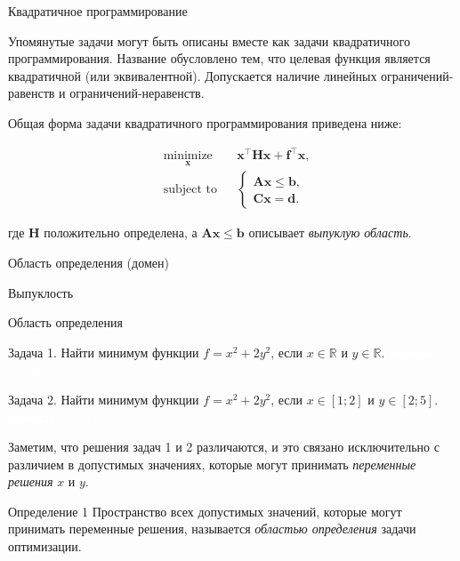 \documentclass{beamer}
\begin{document}
\begin{frame}{Квадратичное программирование}
	\begin{flushleft}
		
		Упомянутые задачи могут быть описаны вместе как задачи квадратичного программирования. Название обусловлено тем, что целевая функция является квадратичной (или эквивалентной). Допускается наличие линейных ограничений-равенств и ограничений-неравенств.
		
		\bigskip
		
		Общая форма задачи квадратичного программирования приведена ниже:
		
		\begin{equation}
			\begin{aligned}
				& \underset{\mathbf{x}}{\text{minimize}}
				& & \mathbf{x}^\top \mathbf{H} \mathbf{x} + \mathbf{f}^\top\mathbf{x}, \\
				& \text{subject to}
				& & \begin{cases}
					\mathbf{A}\mathbf{x} \leq \mathbf{b}, \\
					\mathbf{C}\mathbf{x} = \mathbf{d}.
				\end{cases}
			\end{aligned}
		\end{equation}
		
		где $\mathbf{H}$ положительно определена, а $\mathbf{A}\mathbf{x} \leq \mathbf{b}$ описывает \emph{выпуклую область}.
		
	\end{flushleft}
\end{frame}

\begin{frame}
	\centerline{\huge Область определения (домен)}
	
	\bigskip
	
	\centerline{\huge Выпуклость}
\end{frame}


\begin{frame}{Область определения}
	\begin{flushleft}
		
		Задача 1. Найти минимум функции $f = x^2 + 2y^2$, если $x \in \mathbb{R}$ и $y \in \mathbb{R}$. \textcolor{white}{Решение: $x = 0$, $y = 0$.}
		
		\bigskip
		
		Задача 2. Найти минимум функции $f = x^2 + 2y^2$, если $x \in [1 ; 2]$ и $y \in [2 ; 5]$. \textcolor{white}{Решение: $x = 1$, $y = 2$.}
		
		\bigskip
		
		Заметим, что решения задач 1 и 2 различаются, и это связано исключительно с различием в допустимых значениях, которые могут принимать \emph{переменные решения} $x$ и $y$.
		
		\begin{block}{Определение 1}
			Пространство всех допустимых значений, которые могут принимать переменные решения, называется \emph{областью определения} задачи оптимизации.
		\end{block}
		
	\end{flushleft}
\end{frame}
\end{document}
